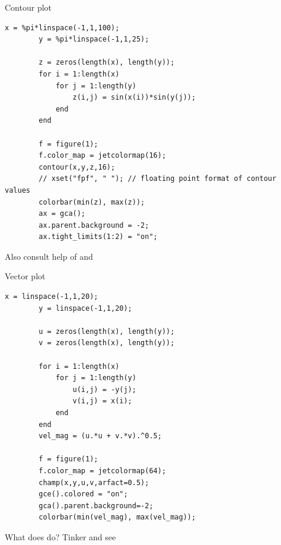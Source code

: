 \begin{frame}[fragile]{Contour plot}
    \vspace{-0.5em}
    \begin{lstlisting}[basicstyle=\small\ttfamily\linespread{1}]
        x = %pi*linspace(-1,1,100);
        y = %pi*linspace(-1,1,25);
        
        z = zeros(length(x), length(y));
        for i = 1:length(x)
            for j = 1:length(y)
                z(i,j) = sin(x(i))*sin(y(j));
            end
        end
        
        f = figure(1);
        f.color_map = jetcolormap(16);
        contour(x,y,z,16);
        // xset("fpf", " "); // floating point format of contour values
        colorbar(min(z), max(z));
        ax = gca();
        ax.parent.background = -2;
        ax.tight_limits(1:2) = "on";
    \end{lstlisting}
    Also consult help of  and 
\end{frame}

\begin{frame}[fragile]{Vector plot}
    \vspace{-0.5em}
    \begin{lstlisting}[basicstyle=\footnotesize\ttfamily\linespread{1.1}]
        x = linspace(-1,1,20);
        y = linspace(-1,1,20);
        
        u = zeros(length(x), length(y));
        v = zeros(length(x), length(y));
        
        for i = 1:length(x)
            for j = 1:length(y)
                u(i,j) = -y(j);
                v(i,j) = x(i);
            end
        end
        vel_mag = (u.*u + v.*v).^0.5;
        
        f = figure(1);
        f.color_map = jetcolormap(64);
        champ(x,y,u,v,arfact=0.5);
        gce().colored = "on";
        gca().parent.background=-2;
        colorbar(min(vel_mag), max(vel_mag));
    \end{lstlisting}
    What does  do? Tinker and see
\end{frame}


